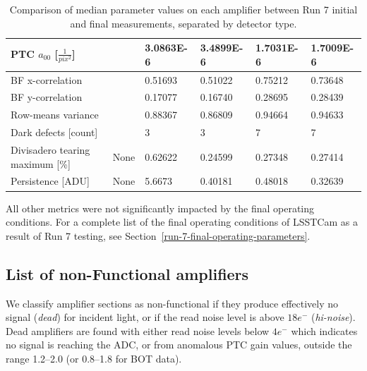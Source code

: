 \begin{table}[ht]
{\begin{tabular}{|l|l|ll|ll|}
PTC $a_{00}$ [$\frac{1}{pix^2}$]  &                                & \multicolumn{1}{l|}{3.0863E-6}              &       3.4899E-6      & \multicolumn{1}{l|}{1.7031E-6}              &        1.7009E-6     \\ \hline
BF x-correlation                  &                                & \multicolumn{1}{l|}{0.51693}              &     0.51022        & \multicolumn{1}{l|}{0.75212}              &       0.73648      \\ \hline
BF y-correlation                  &                                & \multicolumn{1}{l|}{0.17077}              &       0.16740      & \multicolumn{1}{l|}{0.28695}              &        0.28439     \\ \hline
Row-means variance                &                                & \multicolumn{1}{l|}{0.88367}              &      0.86809       & \multicolumn{1}{l|}{0.94664}              &        0.94633     \\ \hline
Dark defects {[}count{]}          &                                & \multicolumn{1}{l|}{3}              &       3      & \multicolumn{1}{l|}{7}              &       7      \\ \hline
Divisadero tearing maximum {[}\%{]} &     None                     & \multicolumn{1}{l|}{0.62622}              &       0.24599      & \multicolumn{1}{l|}{0.27348}              &       0.27414      \\ \hline
Persistence {[}ADU{]}             &       None                         & \multicolumn{1}{l|}{5.6673}              &       0.40181      & \multicolumn{1}{l|}{0.48018}              &       0.32639      \\ \hline
\end{tabular}
}
\caption{Comparison of median parameter values on each amplifier between Run 7 initial and final measurements, separated by detector type.}
\label{table:FinalChar-paramTable}
\end{table}

All other metrics were not significantly impacted by the final operating conditions. For a complete list of the final operating conditions of LSSTCam as a result of Run 7 testing, see Section~\ref{run-7-final-operating-parameters}.


\clearpage
\subsection{List of non-Functional amplifiers}\label{deadamplifiers}

We classify amplifier sections as non-functional if they produce effectively no signal ({\it dead}) for incident light, or if the read noise level is above $18e^{-}$ ({\it hi-noise}).  Dead amplifiers are found with either read noise levels below $4e^{-}$ which indicates no signal is reaching the ADC, or from anomalous PTC gain values, outside the range 1.2--2.0 (or 0.8--1.8 for BOT data). 

